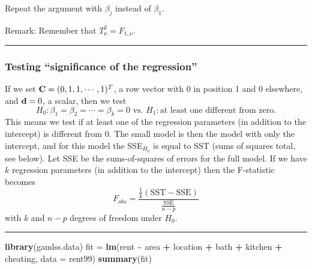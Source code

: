 \documentclass[
]{article}
\newenvironment{Shaded}{\begin{snugshade}}{\end{snugshade}}
\newcommand{\AttributeTok}[1]{\textcolor[rgb]{0.13,0.29,0.53}{#1}}
\newcommand{\FunctionTok}[1]{\textcolor[rgb]{0.13,0.29,0.53}{\textbf{#1}}}
\newcommand{\NormalTok}[1]{#1}
\newcommand{\OtherTok}[1]{\textcolor[rgb]{0.56,0.35,0.01}{#1}}
\newcommand{\SpecialCharTok}[1]{\textcolor[rgb]{0.81,0.36,0.00}{\textbf{#1}}}
\begin{document}
Repeat the argument with \(\beta_j\) instead of \(\beta_1\).

Remark: Remember that \(T_{\nu}^2=F_{1,\nu}\).

\begin{center}\rule{0.5\linewidth}{0.5pt}\end{center}

\hypertarget{testing-significance-of-the-regression}{%
\subsubsection{Testing ``significance of the
regression''}\label{testing-significance-of-the-regression}}

If we set \({\bf C}=(0,1,1, \cdots ,1)^T\), a row vector with 0 in
position 1 and 0 elsewhere, and \({\bf d}=0\), a scalar, then we test
\[ H_0: \beta_1=\beta_2=\cdots= \beta_k =0 \text{ vs. } H_1: \text{at least one different from zero}.\]
This means we test if at least one of the regression parameters (in
addition to the intercept) is different from 0. The small model is then
the model with only the intercept, and for this model the SSE\(_{H_0}\)
is equal to SST (sums of squares total, see below). Let SSE be the
sums-of-squares of errors for the full model. If we have \(k\)
regression parameters (in addition to the intercept) then the
F-statistic becomes
\[ F_{obs}=\frac{\frac{1}{k}(\text{SST}-\text{SSE})}{\frac{\text{SSE}}{n-p}}\]
with \(k\) and \(n-p\) degrees of freedom under \(H_0\).

\begin{center}\rule{0.5\linewidth}{0.5pt}\end{center}

\footnotesize

\begin{Shaded}
\begin{Highlighting}[]
\FunctionTok{library}\NormalTok{(gamlss.data)}
\NormalTok{fit }\OtherTok{=} \FunctionTok{lm}\NormalTok{(rent }\SpecialCharTok{\textasciitilde{}}\NormalTok{ area }\SpecialCharTok{+}\NormalTok{ location }\SpecialCharTok{+}\NormalTok{ bath }\SpecialCharTok{+}\NormalTok{ kitchen }\SpecialCharTok{+}\NormalTok{ cheating, }\AttributeTok{data =}\NormalTok{ rent99)}
\FunctionTok{summary}\NormalTok{(fit)}
\end{Highlighting}
\end{Shaded}
\end{document}
